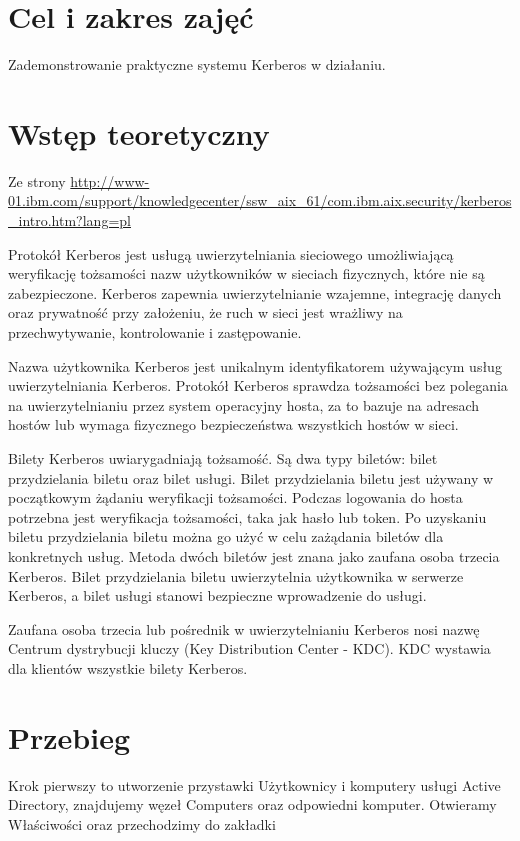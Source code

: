 \documentclass[a4paper,twoside,12pt]{mgr}
\begin{document}
\stronaTytulowa

\tableofcontents
\chapter{Cel i zakres zajęć}
Zademonstrowanie praktyczne systemu Kerberos w działaniu.

\chapter{Wstęp teoretyczny}
Ze strony \url{http://www-01.ibm.com/support/knowledgecenter/ssw_aix_61/com.ibm.aix.security/kerberos_intro.htm?lang=pl}

Protokół Kerberos jest usługą uwierzytelniania sieciowego umożliwiającą weryfikację tożsamości nazw użytkowników w sieciach fizycznych, które nie są zabezpieczone. Kerberos zapewnia uwierzytelnianie wzajemne, integrację danych oraz prywatność przy założeniu, że ruch w sieci jest wrażliwy na przechwytywanie, kontrolowanie i zastępowanie.

Nazwa użytkownika Kerberos jest unikalnym identyfikatorem używającym usług uwierzytelniania Kerberos. Protokół Kerberos sprawdza tożsamości bez polegania na uwierzytelnianiu przez system operacyjny hosta, za to bazuje na adresach hostów lub wymaga fizycznego bezpieczeństwa wszystkich hostów w sieci.

Bilety Kerberos uwiarygadniają tożsamość. Są dwa typy biletów: bilet przydzielania biletu oraz bilet usługi. Bilet przydzielania biletu jest używany w początkowym żądaniu weryfikacji tożsamości. Podczas logowania do hosta potrzebna jest weryfikacja tożsamości, taka jak hasło lub token. Po uzyskaniu biletu przydzielania biletu można go użyć w celu zażądania biletów dla konkretnych usług. Metoda dwóch biletów jest znana jako zaufana osoba trzecia Kerberos. Bilet przydzielania biletu uwierzytelnia użytkownika w serwerze Kerberos, a bilet usługi stanowi bezpieczne wprowadzenie do usługi.

Zaufana osoba trzecia lub pośrednik w uwierzytelnianiu Kerberos nosi nazwę Centrum dystrybucji kluczy (Key Distribution Center - KDC). KDC wystawia dla klientów wszystkie bilety Kerberos.

\chapter{Przebieg}
Krok pierwszy to utworzenie przystawki Użytkownicy i komputery usługi Active Directory, znajdujemy węzeł Computers oraz odpowiedni komputer. Otwieramy Właściwości oraz przechodzimy do zakładki
\end{document}
